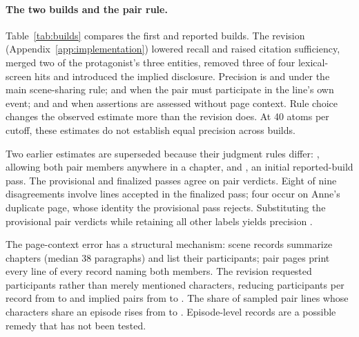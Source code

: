 \paragraph{The two builds and the pair rule.}
Table~\ref{tab:builds} compares the first and reported builds.
The revision (Appendix~\ref{app:implementation}) lowered recall and raised
citation sufficiency, merged two of the protagonist's three entities, removed
three of four lexical-screen hits and introduced the implied disclosure.
Precision is  and  under the main
scene-sharing rule;  and  when the pair must
participate in the line's own event; and  and
 when assertions are assessed without page context.
Rule choice changes the observed estimate more than the revision does.
At 40 atoms per cutoff, these estimates do not establish equal precision across
builds.

Two earlier estimates are superseded because their judgment rules differ:
, allowing both pair members anywhere in a chapter,
and , an initial reported-build pass.
The provisional and finalized passes agree on  pair verdicts. Eight of nine
disagreements involve lines accepted in the finalized pass; four occur on
Anne's duplicate page, whose identity the provisional pass rejects.
Substituting the provisional pair verdicts while retaining all other
labels yields precision .

The page-context error has a structural mechanism: scene records summarize
chapters (median 38 paragraphs) and list their participants; pair pages print
every line of every record naming both members. The revision requested
participants rather than merely mentioned characters, reducing participants
per record from  to  and implied pairs from
 to . The share of sampled pair lines whose
characters share an episode rises from  to .
Episode-level records are a possible remedy that has not been tested.
